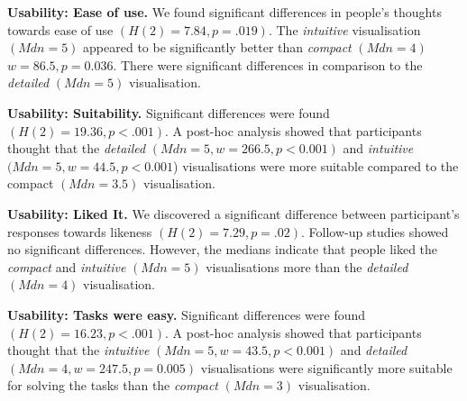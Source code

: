 \documentclass[final,5p,times,twocolumn,authoryear]{elsarticle}
\begin{document}
\textbf{Usability: Ease of use.} We found significant differences in people's thoughts towards ease of use $(H(2) = 7.84, p = .019)$. The \emph{intuitive} visualisation $(Mdn = 5)$ appeared to be significantly better than \emph{compact} $(Mdn = 4)$ $w = 86.5, p = 0.036$. There were  significant differences in comparison to the \emph{detailed} $(Mdn = 5)$ visualisation. 

\textbf{Usability: Suitability.} Significant differences were found $(H(2) = 19.36, p < .001)$. A post-hoc analysis showed that participants thought that the \emph{detailed} $(Mdn = 5, w = 266.5, p < 0.001)$ and \emph{intuitive} $(Mdn = 5, w = 44.5, p < 0.001$) visualisations were more suitable compared to the compact $(Mdn = 3.5)$ visualisation.

\textbf{Usability: Liked It.} We discovered a significant difference between participant's responses towards likeness $(H(2) = 7.29, p = .02)$. Follow-up studies showed no significant differences. However, the medians indicate that people liked the \emph{compact} and \emph{intuitive} $(Mdn = 5)$ visualisations more than the \emph{detailed} $(Mdn = 4)$ visualisation.




\textbf{Usability: Tasks were easy.} Significant differences were found $(H(2) = 16.23, p < .001)$. A post-hoc analysis showed that participants thought that the \emph{intuitive}  $(Mdn = 5, w = 43.5, p < 0.001)$ and \emph{detailed} $(Mdn = 4, w = 247.5, p = 0.005)$ visualisations were significantly more suitable for solving the tasks than the \emph{compact} $(Mdn = 3)$ visualisation.


\end{document}
